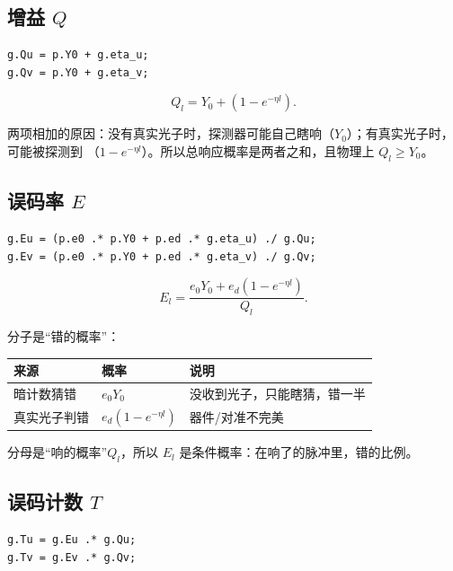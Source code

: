 \documentclass[UTF8,11pt,a4paper]{ctexart}
\begin{document}
\subsection{增益 $Q$}

\begin{lstlisting}
g.Qu = p.Y0 + g.eta_u;
g.Qv = p.Y0 + g.eta_v;
\end{lstlisting}

\begin{equation}
Q_l=Y_0+\left(1-e^{-\eta l}\right).
\end{equation}

两项相加的原因：没有真实光子时，探测器可能自己瞎响（$Y_0$）；有真实光子时，可能被探测到
（$1-e^{-\eta l}$）。所以总响应概率是两者之和，且物理上 $Q_l\ge Y_0$。

\subsection{误码率 $E$}

\begin{lstlisting}
g.Eu = (p.e0 .* p.Y0 + p.ed .* g.eta_u) ./ g.Qu;
g.Ev = (p.e0 .* p.Y0 + p.ed .* g.eta_v) ./ g.Qv;
\end{lstlisting}

\begin{equation}
E_l=\frac{e_0Y_0+e_d\left(1-e^{-\eta l}\right)}{Q_l}.
\end{equation}

分子是“错的概率”：

\begin{center}
\begin{tabular}{@{}lll@{}}
\toprule
来源 & 概率 & 说明\\
\midrule
暗计数猜错 & $e_0Y_0$ & 没收到光子，只能瞎猜，错一半\\
真实光子判错 & $e_d(1-e^{-\eta l})$ & 器件/对准不完美\\
\bottomrule
\end{tabular}
\end{center}

分母是“响的概率”$Q_l$，所以 $E_l$ 是条件概率：在响了的脉冲里，错的比例。

\subsection{误码计数 $T$}

\begin{lstlisting}
g.Tu = g.Eu .* g.Qu;
g.Tv = g.Ev .* g.Qv;
\end{lstlisting}
\end{document}
